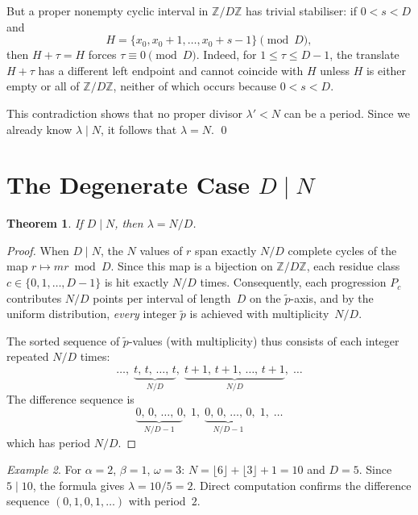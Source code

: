 \documentclass[11pt]{article}
\theoremstyle{plain}
\newtheorem{theorem}{Theorem}[section]
\theoremstyle{definition}
\theoremstyle{remark}
\newtheorem{example}[theorem]{Example}
\begin{document}
But a proper nonempty cyclic interval in $\mathbb{Z}/D\mathbb{Z}$ has trivial
stabiliser: if $0<s<D$ and
\[
    H=\{x_0,x_0+1,\ldots,x_0+s-1\}\pmod D,
\]
then $H+\tau=H$ forces $\tau\equiv 0\pmod D$.
Indeed, for $1\le \tau \le D-1$, the translate $H+\tau$ has a different left
endpoint and cannot coincide with $H$ unless $H$ is either empty or all of
$\mathbb{Z}/D\mathbb{Z}$, neither of which occurs because $0<s<D$.

This contradiction shows that no proper divisor $\lambda' < N$ can be a
period.  Since we already know $\lambda \mid N$, it follows that $\lambda=N$.
\qed

\section{The Degenerate Case $D \mid N$}\label{sec:degenerate}

\begin{theorem}\label{thm:degenerate}
If $D \mid N$, then $\lambda = N/D$.
\end{theorem}

\begin{proof}
When $D \mid N$, the $N$ values of $r$ span exactly $N/D$ complete cycles
of the map $r \mapsto mr \bmod D$.
Since this map is a bijection on $\mathbb{Z}/D\mathbb{Z}$, each residue
class $c \in \{0, 1, \ldots, D-1\}$ is hit exactly $N/D$ times.
Consequently, each progression $P_c$ contributes $N/D$ points per interval
of length~$D$ on the $\tilde{p}$-axis, and by the uniform distribution,
\emph{every} integer $\tilde{p}$ is achieved with multiplicity~$N/D$.

The sorted sequence of $\tilde{p}$-values (with multiplicity) thus
consists of each integer repeated $N/D$ times:
\[
    \ldots,\;
    \underbrace{t,\, t,\, \ldots,\, t}_{N/D},\;
    \underbrace{t+1,\, t+1,\, \ldots,\, t+1}_{N/D},\;
    \ldots
\]
The difference sequence is
\[
    \underbrace{0,\, 0,\, \ldots,\, 0}_{N/D - 1},\; 1,\;
    \underbrace{0,\, 0,\, \ldots,\, 0}_{N/D - 1},\; 1,\;
    \ldots
\]
which has period $N/D$.
\end{proof}

\begin{example}\label{ex:degenerate}
For $\alpha = 2$, $\beta = 1$, $\omega = 3$:
$N = \lfloor 6 \rfloor + \lfloor 3 \rfloor + 1 = 10$ and $D = 5$.
Since $5 \mid 10$, the formula gives $\lambda = 10/5 = 2$.
Direct computation confirms the difference sequence
$(0, 1, 0, 1, \ldots)$ with period~$2$.
\end{example}
\end{document}
